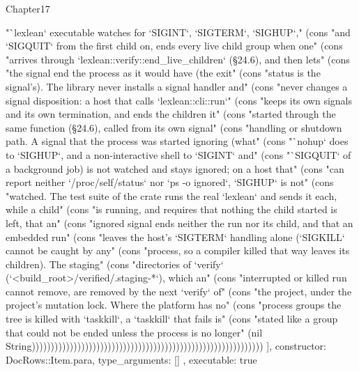 \begin{lexlean}{Chapter17}
\begin{semanticmodule}
{{"`lexlean` executable watches for `SIGINT`, `SIGTERM`, `SIGHUP`," (cons "and `SIGQUIT` from the first child on, ends every live child group when one" (cons "arrives through `lexlean::verify::end_live_children` (§24.6), and then lets" (cons "the signal end the process as it would have (the exit" (cons "status is the signal's). The library never installs a signal handler and" (cons "never changes a signal disposition: a host that calls `lexlean::cli::run`" (cons "keeps its own signals and its own termination, and ends the children it" (cons "started through the same function (§24.6), called from its own signal" (cons "handling or shutdown path. A signal that the process was started ignoring (what" (cons "`nohup` does to `SIGHUP`, and a non-interactive shell to `SIGINT` and" (cons "`SIGQUIT` of a background job) is not watched and stays ignored; on a host that" (cons "can report neither `/proc/self/status` nor `ps -o ignored`, `SIGHUP` is not" (cons "watched. The test suite of the crate runs the real `lexlean` and sends it each, while a child" (cons "is running, and requires that nothing the child started is left, that an" (cons "ignored signal ends neither the run nor its child, and that an embedded run" (cons "leaves the host's `SIGTERM` handling alone (`SIGKILL` cannot be caught by any" (cons "process, so a compiler killed that way leaves its children). The staging" (cons "directories of `verify` (`<build_root>/verified/.staging-*`), which an" (cons "interrupted or killed run cannot remove, are removed by the next `verify` of" (cons "the project, under the project's mutation lock. Where the platform has no" (cons "process groups the tree is killed with `taskkill`, a `taskkill` that fails is" (cons "stated like a group that could not be ended unless the process is no longer" (nil String)))))))))))))))))))))))))))))))))))))))))))))))))))))))))))))
    ],
    constructor: DocRows::Item.para,
    type_arguments: []
  },
  executable: true
}


\end{semanticmodule}
\end{lexlean}
